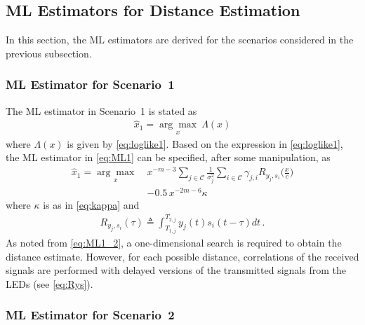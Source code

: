 \documentclass[10pt,twocolumn]{IEEEtran}
\newcommand{\mtC}{{\mathcal{C}}}
\begin{document}
\subsection{ML Estimators for Distance Estimation}\label{sec:ML}

In this section, the ML estimators are derived for the scenarios considered in the previous subsection.

\subsubsection{ML Estimator for Scenario~1}\label{sec:ML1}

The ML estimator in Scenario~1 is stated as
\begin{gather}\label{eq:ML1}
\widehat{x}_1=\underset{x}{\arg\max}~\Lambda(x)
\end{gather}
where $\Lambda(x)$ is given by \eqref{eq:loglike1}. Based on the expression in \eqref{eq:loglike1}, the ML estimator in \eqref{eq:ML1} can be specified, after some manipulation, as
\begin{align}\nonumber
\widehat{x}_1=\underset{x}{\arg\max}~&x^{-m-3}
\sum_{j\in\mtC}\frac{1}{\sigma_j^2}
\sum_{i\in\mtC}
\gamma_{j,i}R_{y_j,s_i}\bigg(\frac{x}{c}\bigg)
\\\label{eq:ML1_2}
&-0.5\,x^{-2m-6}\kappa
\end{align}
where $\kappa$ is as in \eqref{eq:kappa} and
\begin{gather}\label{eq:Rys}
R_{y_j,s_i}(\tau)\triangleq \int_{T_{1,j}}^{T_{2,j}}y_j(t)s_i(t-\tau)dt\,.
\end{gather}
As noted from \eqref{eq:ML1_2}, a one-dimensional search is required to obtain the distance estimate. However, for each possible distance, correlations of the received signals are performed with delayed versions of the transmitted signals from the LEDs (see \eqref{eq:Rys}).

\subsubsection{ML Estimator for Scenario~2}\label{sec:ML2}
\end{document}
